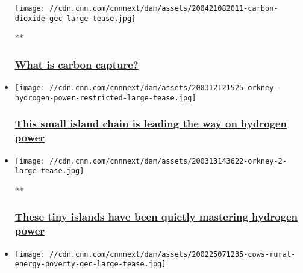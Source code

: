 \begin{itemize}
  \texttt{[image: //cdn.cnn.com/cnnnext/dam/assets/200421082011-carbon-dioxide-gec-large-tease.jpg]}

  **

  \hypertarget{what-is-carbon-capture}{%
  \subsubsection{\texorpdfstring{\href{/videos/business/2020/04/21/carbon-capture-explainer-gec.cnn-business}{What
  is carbon
  capture?}}{What is carbon capture?}}\label{what-is-carbon-capture}}
\item
  \href{/2020/03/13/business/orkney-hydrogen-power/index.html}{}

  \texttt{[image: //cdn.cnn.com/cnnnext/dam/assets/200312121525-orkney-hydrogen-power-restricted-large-tease.jpg]}

  \hypertarget{this-small-island-chain-is-leading-the-way-on-hydrogen-power}{%
  \subsubsection{\texorpdfstring{\href{/2020/03/13/business/orkney-hydrogen-power/index.html}{This
  small island chain is leading the way on hydrogen
  power}}{This small island chain is leading the way on hydrogen power}}\label{this-small-island-chain-is-leading-the-way-on-hydrogen-power}}
\item
  \href{/videos/business/2020/03/06/orkney-hydrogen-energy-lon-orig.cnn-business}{}

  \texttt{[image: //cdn.cnn.com/cnnnext/dam/assets/200313143622-orkney-2-large-tease.jpg]}

  **

  \hypertarget{these-tiny-islands-have-been-quietly-mastering-hydrogen-power}{%
  \subsubsection{\texorpdfstring{\href{/videos/business/2020/03/06/orkney-hydrogen-energy-lon-orig.cnn-business}{These
  tiny islands have been quietly mastering hydrogen
  power}}{These tiny islands have been quietly mastering hydrogen power}}\label{these-tiny-islands-have-been-quietly-mastering-hydrogen-power}}
\item
  \href{/videos/business/2020/02/25/rural-energy-poverty-gec.cnn-business}{}

  \texttt{[image: //cdn.cnn.com/cnnnext/dam/assets/200225071235-cows-rural-energy-poverty-gec-large-tease.jpg]}


\end{itemize}
